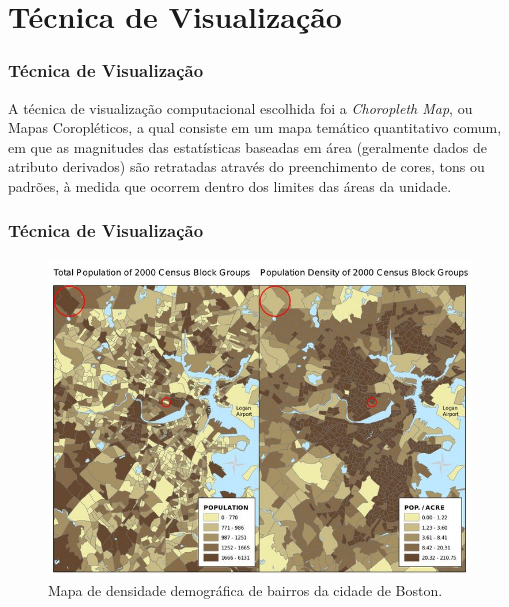 \documentclass[aspectratio=169]{beamer}
\begin{document}
\section{Técnica de Visualização}


\begin{frame}
\frametitle{Técnica de Visualização}
\justifying

A técnica de visualização computacional escolhida foi a \textit{Choropleth Map}, ou Mapas Coropléticos, a qual consiste em um mapa temático quantitativo comum, em que as magnitudes das estatísticas baseadas em área (geralmente dados de atributo derivados) são retratadas através do preenchimento de cores, tons ou padrões, à medida que ocorrem dentro dos limites das áreas da unidade.

\end{frame}

\begin{frame}
\frametitle{Técnica de Visualização}
\justifying

\begin{figure}
\centering
\includegraphics[width=.45\textwidth]{images/boston-density.jpg}
\caption{Mapa de densidade demográfica de bairros da cidade de Boston.}
\end{figure}


\end{frame}
\end{document}
